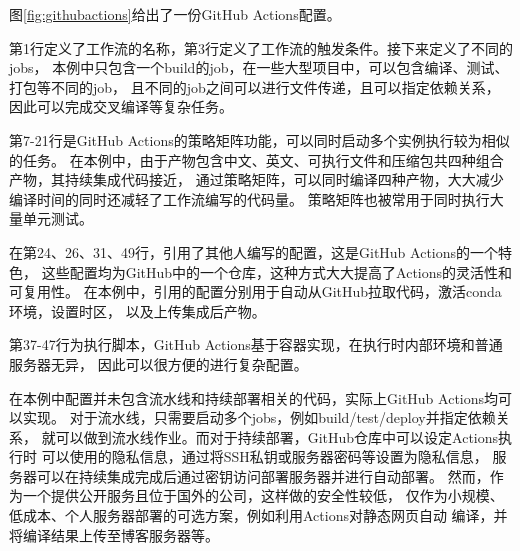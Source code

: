 图\ref{fig:githubactions}给出了一份GitHub Actions配置。

第1行定义了工作流的名称，第3行定义了工作流的触发条件。接下来定义了不同的jobs，
本例中只包含一个build的job，在一些大型项目中，可以包含编译、测试、打包等不同的job，
且不同的job之间可以进行文件传递，且可以指定依赖关系，因此可以完成交叉编译等复杂任务。

第7-21行是GitHub Actions的策略矩阵功能，可以同时启动多个实例执行较为相似的任务。
在本例中，由于产物包含中文、英文、可执行文件和压缩包共四种组合产物，其持续集成代码接近，
通过策略矩阵，可以同时编译四种产物，大大减少编译时间的同时还减轻了工作流编写的代码量。
策略矩阵也被常用于同时执行大量单元测试。

在第24、26、31、49行，引用了其他人编写的配置，这是GitHub Actions的一个特色，
这些配置均为GitHub中的一个仓库，这种方式大大提高了Actions的灵活性和可复用性。
在本例中，引用的配置分别用于自动从GitHub拉取代码，激活conda环境，设置时区，
以及上传集成后产物。

第37-47行为执行脚本，GitHub Actions基于容器实现，在执行时内部环境和普通服务器无异，
因此可以很方便的进行复杂配置。

在本例中配置并未包含流水线和持续部署相关的代码，实际上GitHub Actions均可以实现。
对于流水线，只需要启动多个jobs，例如build/test/deploy并指定依赖关系，
就可以做到流水线作业。而对于持续部署，GitHub仓库中可以设定Actions执行时
可以使用的隐私信息，通过将SSH私钥或服务器密码等设置为隐私信息，
服务器可以在持续集成完成后通过密钥访问部署服务器并进行自动部署。
然而，作为一个提供公开服务且位于国外的公司，这样做的安全性较低，
仅作为小规模、低成本、个人服务器部署的可选方案，例如利用Actions对静态网页自动
编译，并将编译结果上传至博客服务器等。